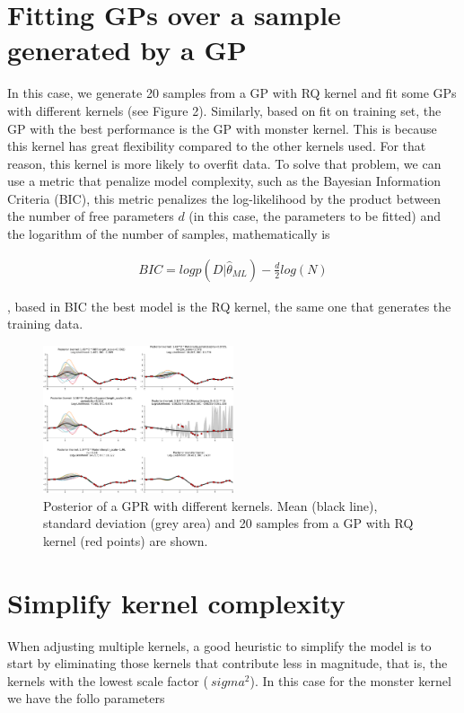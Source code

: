 \documentclass{article}
\begin{document}
\section{Fitting GPs over a sample generated by a GP}

In this case, we generate 20 samples from a GP with RQ kernel and fit some GPs with different kernels (see Figure 2). Similarly, based on fit on training set, the GP with the best performance is the GP with monster kernel. This is because this kernel has great flexibility compared to the other kernels used. For that reason, this kernel is more likely to overfit data. To solve that problem, we can use a metric that penalize model complexity, such as the Bayesian Information Criteria (BIC), this metric penalizes the log-likelihood by the product between the number of free parameters $d$ (in this case, the parameters to be fitted) and the logarithm of the number of samples, mathematically is 

\begin{align}
    BIC = log p(D|\hat{\theta}_{ML})-\frac{d}{2}log(N)
\end{align}

, based in BIC the best model is the RQ kernel, the same one that generates the training data.

\begin{figure}[h]
    \includegraphics[width=0.5\textwidth]{img/gp2.pdf}  
    \caption{Posterior of a GPR with different kernels. Mean (black line), standard deviation (grey area) and 20 samples from a GP with RQ kernel (red points) are shown.}
\end{figure}

\section{Simplify kernel complexity}

When adjusting multiple kernels, a good heuristic to simplify the model is to start by eliminating those kernels that contribute less in magnitude, that is, the kernels with the lowest scale factor ($ \ sigma ^ {2} $). In this case for the monster kernel we have the follo parameters
\end{document}
